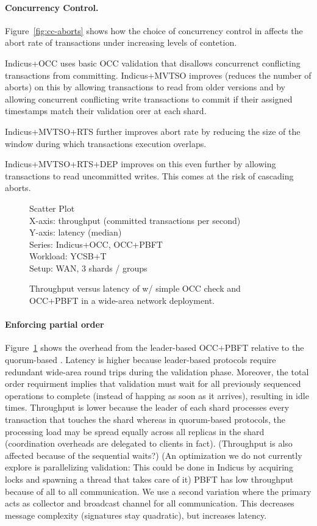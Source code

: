 \paragraph{Concurrency Control.} Figure~\ref{fig:cc-aborts} shows how the choice of concurrency control in
\sys{} affects the abort rate of transactions under increasing levels of 
contetion.

Indicus+OCC uses basic OCC validation that disallows concurrenct conflicting
transactions from committing. Indicus+MVTSO improves (reduces the number of
aborts) on this by allowing transactions to read from older versions and by
allowing concurrent conflicting write transactions to commit if their assigned
timestamps match their validation orer at each shard.

Indicus+MVTSO+RTS further improves abort rate by reducing the size of the window
during which transactions execution overlaps. 

Indicus+MVTSO+RTS+DEP improves on this even further by allowing transactions to
read uncommitted writes. This comes at the risk of cascading aborts.

\begin{figure}
  Scatter Plot\\
  X-axis: throughput (committed transactions per second)\\
  Y-axis: latency (median)\\
  Series: Indicus+OCC, OCC+PBFT\\
  Workload: YCSB+T\\
  Setup: WAN, 3 shards / groups\\
  \caption{Throughput versus latency of \sys{} w/ simple OCC check and
  OCC+PBFT in a wide-area network deployment.}
  \label{fig:to-vs-po-tput-lat}
\end{figure}

\paragraph{Enforcing partial order} Figure~\ref{fig:to-vs-po-tput-lat} shows the overhead from the leader-based
OCC+PBFT relative to the quorum-based \sys{}. Latency is higher because leader-based
protocols require redundant wide-area round trips during the validation phase. Moreover, the total order requirment implies that validation must wait for all previously sequenced operations to complete (instead of happing as soon as it arrives), resulting in idle times.
Throughput is lower because the leader of each shard processes every transaction
that touches the shard whereas in quorum-based protocols, the processing load 
may be spread equally across all replicas in the shard (coordination overheads are delegated to clients in fact). (Throughput is also affected because of the sequential waits?)
(An optimization we do not currently explore is parallelizing validation: This could be done in Indicus by acquiring locks and spawning a thread that takes care of it)
PBFT has low throughput because of all to all communication. We use a second variation where the primary acts as collector and broadcast channel for all communication. This decreases message complexity (signatures stay quadratic), but increases latency.

